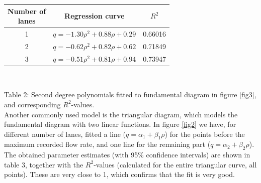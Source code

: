 \documentclass[a4paper,12pt]{article}
\begin{document}
\begin{center}
\def\arraystretch{1.5}
\begin{tabular}{ |c|c|c| } 
 \hline
	\makecell{Number of\\ lanes} & Regression curve & $R^2$ \\
 \hline
	 1 & $q= -1.30\rho^2+0.88\rho+0.29$  & 0.66016  \\
	 2 & $q= -0.62\rho^2+0.82\rho+0.62$ & 0.71849 \\
	 3 &$ q= -0.51\rho^2+0.81\rho+0.94 $& 0.73947 \\
 \hline
\end{tabular}\\
\end{center}
Table 2: Second degree polynomials fitted to fundamental diagram in figure \ref{fig3}, and corresponding $R^2$-values.\\

Another commonly used model is the triangular diagram, which models the fundamental diagram with two linear functions. In figure \ref{fig2} we have, for different number of lanes, fitted a line ($q = \alpha_1+\beta_1\rho$) for the points before the maximum recorded flow rate, and one line for the remaining part ($q = \alpha_2+\beta_2\rho$). The obtained parameter estimates (with 95\% confidence intervals) are shown in table 3, together with the $R^2$-values (calculated for the entire triangular curve, all points). These are very close to 1, which confirms that the fit is very good.\\
\end{document}
